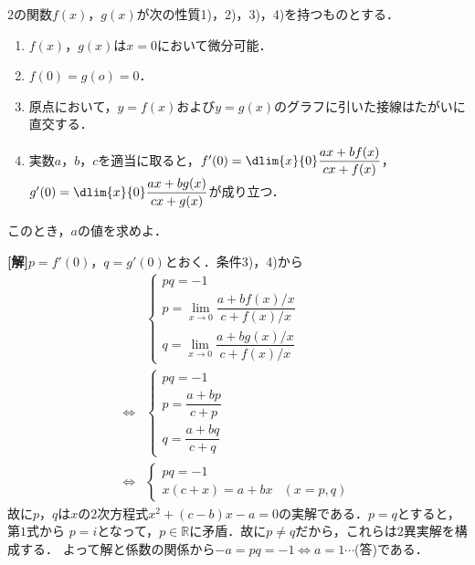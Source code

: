 \documentclass[a4j]{jarticle}
\begin{document}

     \begin{oframed}
     $2$の関数$f(x)$，$g(x)$が次の性質1)，2)，3)，4)を持つものとする．
          \begin{enumerate}[1)]
          \item $f(x)$，$g(x)$は$x=0$において微分可能．
          \item $f(0)=g(o)=0$．
          \item 原点において，$y=f(x)$および$y=g(x)$のグラフに引いた接線はたがいに直交する．
          \item 実数$a$，$b$，$c$を適当に取ると，$f'(0)=\dlim{x}{0}\dfrac{ax+bf(x)}{cx+f(x)}$，
          $g'(0)=\dlim{x}{0}\dfrac{ax+bg(x)}{cx+g(x)}$が成り立つ．
          \end{enumerate}
     このとき，$a$の値を求めよ．     
     \end{oframed}

\setlength{\columnseprule}{0.4pt}
\begin{multicols}{2}
{\bf[解]}$p=f'(0)$，$q=g'(0)$とおく．条件3)，4)から
     \begin{align*}
     &\left\{
          \begin{array}{l}
          pq=-1 \\
          p=\lim_{x\to0}\dfrac{a+bf(x)/x}{c+f(x)/x} \\
          q=\lim_{x\to0}\dfrac{a+bg(x)/x}{c+f(x)/x}
          \end{array}
     \right. \\
     \Longleftrightarrow&\left\{
          \begin{array}{l}
          pq=-1 \\
          p=\dfrac{a+bp}{c+p} \\
          q=\dfrac{a+bq}{c+q}
          \end{array}
     \right.     \\
     \Longleftrightarrow&\left\{
          \begin{array}{ll}
          pq=-1& \\
          x(c+x)=a+bx& (x=p,q)
         \end{array}
     \right.     
     \end{align*}
故に$p$，$q$は$x$の$2$次方程式$x^2+(c-b)x-a=0$の実解である．$p=q$とすると，第$1$式から
$p=i$となって，$p\in\mathbb{R}$に矛盾．故に$p\not=q$だから，これらは$2$異実解を構成する．     
よって解と係数の関係から$-a=pq=-1\Longleftrightarrow a=1\cdots$(答)である．
\newpage
\end{multicols}
\end{document}
